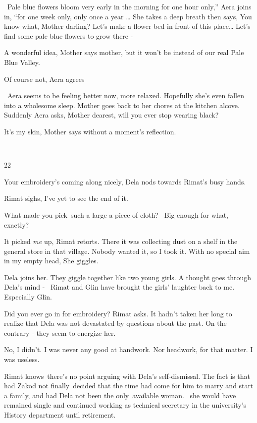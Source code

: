 \documentclass[12pt]{book}
\begin{document}
\ {\textquotedbl}Pale blue flowers bloom very early in the morning for one hour only,'' Aera joins in, ``for one week
only, only once a year {\dots}{\textquotedbl} She takes a deep breath then says, {\textquotedbl}You know what, Mother
darling? Let's make a flower bed in front of this place{\dots} Let's find some pale blue flowers to grow there
-{\textquotedbl}

{\textquotedbl}A wonderful idea,{\textquotedbl} Mother says mother,{\textquotedbl} but it won't be instead of our real
Pale Blue Valley.{\textquotedbl}

{\textquotedbl}Of course not,{\textquotedbl} Aera agrees

\ Aera seems to be feeling better now, more relaxed. Hopefully she's even fallen into a wholesome sleep. Mother goes
back to her chores at the kitchen alcove. Suddenly Aera asks, {\textquotedbl}Mother dearest, will you ever stop wearing
black?{\textquotedbl}

{\textquotedbl}It's my{ }skin,{\textquotedbl} Mother says without a moment's reflection.

~

22~~

{\textquotedbl}Your embroidery's coming along nicely,{\textquotedbl} Dela nods towards Rimat's busy hands.

Rimat sighs, {\textquotedbl}I've yet to see the end of it.{\textquotedbl}

{\textquotedbl}What made you pick~such a large a piece of cloth? \ Big enough for what, exactly?{\textquotedbl}

{\textquotedbl}It picked \textit{me} up,{\textquotedbl} Rimat retorts. {\textquotedbl}There it was collecting dust on a
shelf in the general store in that village. Nobody wanted it, so I took it. With no special aim in my empty
head,{\textquotedbl} She giggles.

Dela joins her. They giggle together like two young girls. A thought goes through Dela's mind - \ Rimat and Glin have
brought the girls' laughter back to me. Especially Glin.

{\textquotedbl}Did you ever go in for embroidery?{\textquotedbl} Rimat asks. It hadn't taken her long to realize that
Dela was not devastated by questions about the past. On the contrary - they seem to energize her.

{\textquotedbl}No, I didn't. I was never any good at handwork. Nor headwork, for that matter. I was
useless.{\textquotedbl}

Rimat knows~there's no point arguing with Dela's self-dismissal. The fact is that had Zakod not finally~decided that the
time had come for him to marry and start a family, and had Dela not been the only~available woman. \ she would have
remained single and continued working as technical secretary in the university's History department until retirement.
\end{document}
